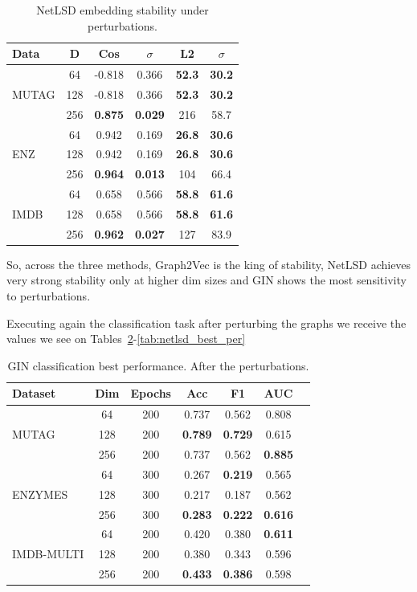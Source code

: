 \begin{table}
\centering
\footnotesize
\setlength{\tabcolsep}{3pt}
\begin{tabular}{l c c c c c}
\hline
\textbf{Data} & \textbf{D} & \textbf{Cos} & \textbf{$\sigma$} & \textbf{L2} & \textbf{$\sigma$} \\
\hline
 & 64  & -0.818 & 0.366 & \textbf{52.3} & \textbf{30.2} \\
MUTAG & 128 & -0.818 & 0.366 & \textbf{52.3} & \textbf{30.2} \\
 & 256 & \textbf{0.875}  & \textbf{0.029} & 216  & 58.7 \\
\hline
   & 64  & 0.942 & 0.169 & \textbf{26.8} & \textbf{30.6} \\
ENZ   & 128 & 0.942 & 0.169 & \textbf{26.8} & \textbf{30.6} \\
   & 256 & \textbf{0.964} & \textbf{0.013} & 104  & 66.4 \\
\hline
 & 64  & 0.658 & 0.566 & \textbf{58.8} & \textbf{61.6} \\
IMDB  & 128 & 0.658 & 0.566 & \textbf{58.8} & \textbf{61.6} \\
  & 256 & \textbf{0.962} & \textbf{0.027} & 127  & 83.9 \\
\hline
\end{tabular}
\caption{NetLSD embedding stability under perturbations.}
\label{tab:stability_netlsd}
\end{table}

So, across the three methods, Graph2Vec is the king of stability,
NetLSD achieves very strong stability only at higher dim sizes
and GIN shows the most sensitivity to perturbations. 

Executing again the classification task after perturbing the graphs we receive
the values we see on Tables~\ref{tab:gin_best_per}-\ref{tab:netlsd_best_per}

\begin{table}
\centering
\begin{tabular}{l c c c c c c}
\hline
\textbf{Dataset} & \textbf{Dim} & \textbf{Epochs} & \textbf{Acc} & \textbf{F1} & \textbf{AUC} \\
\hline
     & 64  & 200 & 0.737 & 0.562 & 0.808 \\
MUTAG      & 128 & 200 & \textbf{0.789} & \textbf{0.729} & 0.615 \\
      & 256 & 200 & 0.737 & 0.562 & \textbf{0.885} \\
\hline
    & 64  & 300& 0.267 & \textbf{0.219} & 0.565 \\
ENZYMES    & 128 & 300  & 0.217 & 0.187 & 0.562 \\
  & 256 & 300 & \textbf{0.283} & \textbf{0.222} & \textbf{0.616} \\
\hline
 & 64  & 200  & 0.420 & 0.380 & \textbf{0.611} \\
IMDB-MULTI & 128 & 200  & 0.380 & 0.343 & 0.596 \\
 & 256 & 200  & \textbf{0.433} & \textbf{0.386} & 0.598 \\
\hline
\end{tabular}
\caption{GIN classification best performance. After the perturbations.}
\label{tab:gin_best_per}
\end{table}


